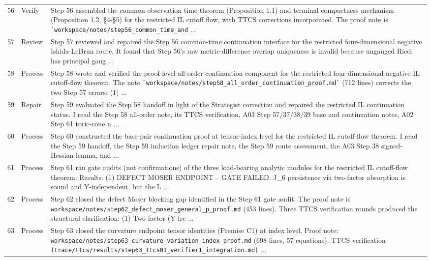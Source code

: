 \documentclass[UTF8,fontset=fandol,zihao=-4]{ctexart}
\begin{document}
\begin{longtable}{r p{} >{\raggedright\arraybackslash}p{}}
56 & Verify & Step 56 assembled the common observation time theorem (Proposition 1.1) and terminal compactness mechanism (Proposition 1.2, §4-§5) for the restricted IL cutoff flow, with TTCS corrections incorporated. The proof note is \nolinkurl{`workspace/notes/step56_common_time_and} ...\\
57 & Review & Step 57 reviewed and repaired the Step 56 common-time continuation interface for the restricted four-dimensional negative Ishida-LeBrun route. It found that Step 56’s raw metric-difference overlap uniqueness is invalid because ungauged Ricci has principal gaug ...\\
58 & Process & Step 58 wrote and verified the proof-level all-order continuation component for the restricted four-dimensional negative IL cutoff-flow theorem. The note \nolinkurl{`workspace/notes/step58_all_order_continuation_proof.md`} (712 lines) corrects the two Step 57 errors: (1)  ...\\
59 & Repair & Step 59 evaluated the Step 58 handoff in light of the Strategist correction and repaired the restricted IL continuation status. I read the Step 58 all-order note, its TTCS verification, A03 Step 57/37/38/39 base and continuation notes, A02 Step 61 toric-cone n ...\\
60 & Process & Step 60 constructed the base-pair continuation proof at tensor-index level for the restricted IL cutoff-flow theorem. I read the Step 59 handoff, the Step 59 induction ledger repair note, the Step 59 route assessment, the A03 Step 38 signed-Hessian lemma, and  ...\\
61 & Process & Step 61 ran gate audits (not confirmations) of the three load-bearing analytic modules for the restricted IL cutoff-flow theorem. Results: (1) DEFECT MOSER ENDPOINT -- GATE FAILED. J\_6 persistence via two-factor absorption is sound and Y-independent, but the L ...\\
62 & Process & Step 62 closed the defect Moser blocking gap identified in the Step 61 gate audit. The proof note is \nolinkurl{workspace/notes/step62_defect_moser_general_p_proof.md} (453 lines). Three TTCS verification rounds produced the structural clarification: (1) Two-factor (Y-fre ...\\
63 & Process & Step 63 closed the curvature endpoint tensor identities (Premise C1) at index level. Proof note: \nolinkurl{workspace/notes/step63_curvature_variation_index_proof.md} (698 lines, 57 equations). TTCS verification \nolinkurl{(trace/ttcs/results/step63_ttcs01_verifier1_integration.md)}  ...\\

\end{longtable}
\end{document}
